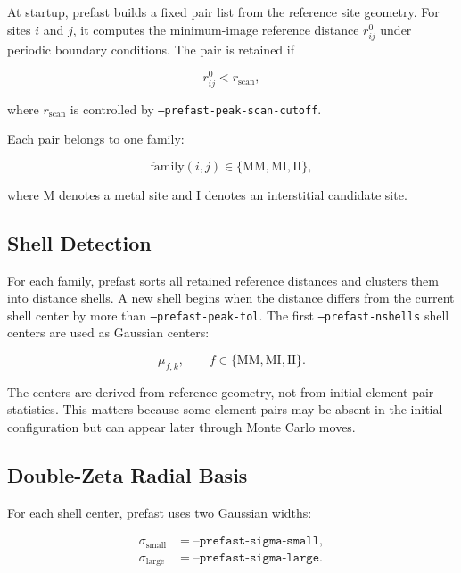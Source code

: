 \documentclass[11pt]{article}
\begin{document}
At startup, prefast builds a fixed pair list from the reference site geometry.
For sites $i$ and $j$, it computes the minimum-image reference distance $r^0_{ij}$ under periodic boundary conditions.
The pair is retained if

\begin{equation}
  r^0_{ij} < r_{\mathrm{scan}},
\end{equation}

where $r_{\mathrm{scan}}$ is controlled by \texttt{--prefast-peak-scan-cutoff}.

Each pair belongs to one family:

\begin{equation}
  \mathrm{family}(i,j) \in \{\mathrm{MM}, \mathrm{MI}, \mathrm{II}\},
\end{equation}

where M denotes a metal site and I denotes an interstitial candidate site.

\subsection{Shell Detection}

For each family, prefast sorts all retained reference distances and clusters them into distance shells.
A new shell begins when the distance differs from the current shell center by more than \texttt{--prefast-peak-tol}.
The first \texttt{--prefast-nshells} shell centers are used as Gaussian centers:

\begin{equation}
  \mu_{f,k}, \qquad f\in\{\mathrm{MM},\mathrm{MI},\mathrm{II}\}.
\end{equation}

The centers are derived from reference geometry, not from initial element-pair statistics.
This matters because some element pairs may be absent in the initial configuration but can appear later through Monte Carlo moves.

\subsection{Double-Zeta Radial Basis}

For each shell center, prefast uses two Gaussian widths:

\begin{align}
  \sigma_{\mathrm{small}} &= \texttt{--prefast-sigma-small}, \\
  \sigma_{\mathrm{large}} &= \texttt{--prefast-sigma-large}.
\end{align}
\end{document}
